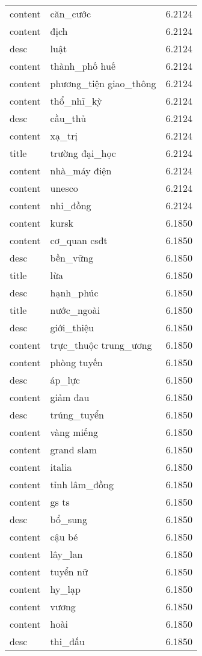 \documentclass{article}
\begin{document}
\begin{tabular}{lll}
content & căn\_cước & 6.2124\\
content & địch & 6.2124\\
desc & luật & 6.2124\\
content & thành\_phố huế & 6.2124\\
content & phương\_tiện giao\_thông & 6.2124\\
content & thổ\_nhĩ\_kỳ & 6.2124\\
desc & cầu\_thủ & 6.2124\\
content & xạ\_trị & 6.2124\\
title & trường đại\_học & 6.2124\\
content & nhà\_máy điện & 6.2124\\
content & unesco & 6.2124\\
content & nhi\_đồng & 6.2124\\
content & kursk & 6.1850\\
content & cơ\_quan csđt & 6.1850\\
desc & bền\_vững & 6.1850\\
title & lừa & 6.1850\\
desc & hạnh\_phúc & 6.1850\\
title & nước\_ngoài & 6.1850\\
desc & giới\_thiệu & 6.1850\\
content & trực\_thuộc trung\_ương & 6.1850\\
content & phòng tuyến & 6.1850\\
desc & áp\_lực & 6.1850\\
content & giảm đau & 6.1850\\
desc & trúng\_tuyển & 6.1850\\
content & vàng miếng & 6.1850\\
content & grand slam & 6.1850\\
content & italia & 6.1850\\
content & tỉnh lâm\_đồng & 6.1850\\
content & gs ts & 6.1850\\
desc & bổ\_sung & 6.1850\\
content & cậu bé & 6.1850\\
content & lây\_lan & 6.1850\\
content & tuyển nữ & 6.1850\\
content & hy\_lạp & 6.1850\\
content & vương & 6.1850\\
content & hoài & 6.1850\\
desc & thi\_đấu & 6.1850\\

\end{tabular}
\end{document}
